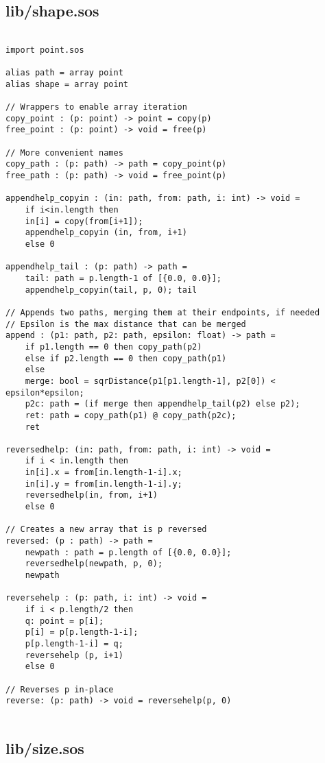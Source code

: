 \documentclass[main.tex]{subfiles}
\begin{document}
\subsection{lib/shape.sos}

\begin{lstlisting}

import point.sos

alias path = array point
alias shape = array point

// Wrappers to enable array iteration
copy_point : (p: point) -> point = copy(p)
free_point : (p: point) -> void = free(p)

// More convenient names
copy_path : (p: path) -> path = copy_point(p)
free_path : (p: path) -> void = free_point(p)

appendhelp_copyin : (in: path, from: path, i: int) -> void = 
    if i<in.length then
    in[i] = copy(from[i+1]);
    appendhelp_copyin (in, from, i+1)
    else 0

appendhelp_tail : (p: path) -> path = 
    tail: path = p.length-1 of [{0.0, 0.0}];
    appendhelp_copyin(tail, p, 0); tail

// Appends two paths, merging them at their endpoints, if needed
// Epsilon is the max distance that can be merged
append : (p1: path, p2: path, epsilon: float) -> path = 
    if p1.length == 0 then copy_path(p2)
    else if p2.length == 0 then copy_path(p1)
    else 
    merge: bool = sqrDistance(p1[p1.length-1], p2[0]) < epsilon*epsilon;
    p2c: path = (if merge then appendhelp_tail(p2) else p2);
    ret: path = copy_path(p1) @ copy_path(p2c);
    ret

reversedhelp: (in: path, from: path, i: int) -> void = 
    if i < in.length then
    in[i].x = from[in.length-1-i].x;
    in[i].y = from[in.length-1-i].y;
    reversedhelp(in, from, i+1)
    else 0

// Creates a new array that is p reversed
reversed: (p : path) -> path =
    newpath : path = p.length of [{0.0, 0.0}];
    reversedhelp(newpath, p, 0);
    newpath

reversehelp : (p: path, i: int) -> void =
    if i < p.length/2 then
    q: point = p[i];
    p[i] = p[p.length-1-i];
    p[p.length-1-i] = q;
    reversehelp (p, i+1)
    else 0

// Reverses p in-place
reverse: (p: path) -> void = reversehelp(p, 0)
    
\end{lstlisting}

\subsection{lib/size.sos}
\end{document}
